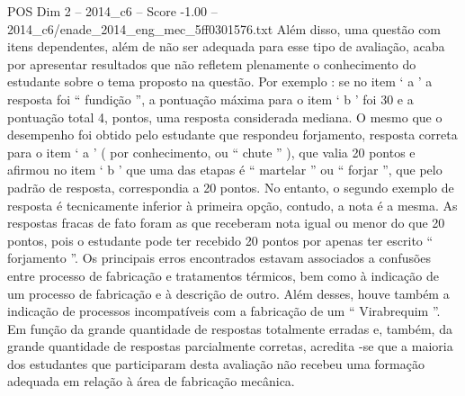 \begin{textsample}{POS Dim 2 – 2014\_c6 – Score -1.00 – 2014\_c6/enade\_2014\_eng\_mec\_5ff0301576.txt}
Além disso, uma questão com itens dependentes, além de não ser adequada para esse tipo de avaliação, acaba por apresentar resultados que não refletem plenamente o conhecimento do estudante sobre o tema proposto na questão.
Por exemplo : se no item ‘ a ’ a resposta foi “ fundição ”, a pontuação máxima para o item ‘ b ’ foi 30 e a pontuação total 4, pontos, uma resposta considerada mediana.
O mesmo que o desempenho foi obtido pelo estudante que respondeu forjamento, resposta correta para o item ‘ a ’ ( por conhecimento, ou “ chute ” ), que valia 20 pontos e afirmou no item ‘ b ’ que uma das etapas é “ martelar ” ou “ forjar ”, que pelo padrão de resposta, correspondia a 20 pontos.
No entanto, o segundo exemplo de resposta é tecnicamente inferior à primeira opção, contudo, a nota é a mesma.
As respostas fracas de fato foram as que receberam nota igual ou menor do que 20 pontos, pois o estudante pode ter recebido 20 pontos por apenas ter escrito “ forjamento ”.
Os principais erros encontrados estavam associados a confusões entre processo de fabricação e tratamentos térmicos, bem como à indicação de um processo de fabricação e à descrição de outro.
Além desses, houve também a indicação de processos incompatíveis com a fabricação de um “ Virabrequim ”.
Em função da grande quantidade de respostas totalmente erradas e, também, da grande quantidade de respostas parcialmente corretas, acredita -se que a maioria dos estudantes que participaram desta avaliação não recebeu uma formação adequada em relação à área de fabricação mecânica.

\end{textsample}
